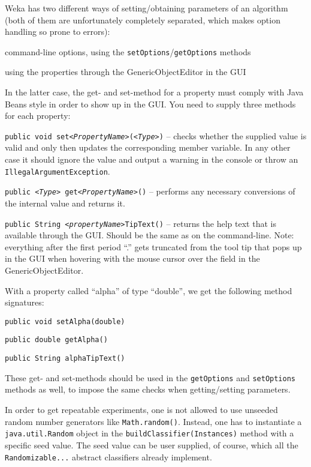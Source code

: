 Weka has two different ways of setting/obtaining parameters of an algorithm
(both of them are unfortunately completely separated, which makes option
handling so prone to errors):
\begin{tight_enumerate}
  \item command-line options, using the \texttt{setOptions}/\texttt{getOptions}
methods
  \item using the properties through the GenericObjectEditor in the GUI
\end{tight_enumerate}
In the latter case, the get- and set-method for a property must comply with 
Java Beans style in order to show up in the GUI. You need to supply three
methods for each property:
\begin{tight_itemize}
  \item \texttt{public void set\textit{<PropertyName>}(\textit{<Type>})} --
checks whether the supplied value is valid and only then updates the
corresponding member variable. In any other case it should ignore the value
and output a warning in the console or throw an
\texttt{IllegalArgumentException}.
  \item \texttt{public \textit{<Type>} get\textit{<PropertyName>}()} --
performs any necessary conversions of the internal value and returns it.
  \item \texttt{public String \textit{<propertyName>}TipText()} -- returns the
help text that is available through the GUI. Should be the same as on the
command-line. Note: everything after the first period ``.'' gets truncated from
the tool tip that pops up in the GUI when hovering with the mouse cursor over
the field in the GenericObjectEditor.
\end{tight_itemize}
With a property called ``alpha'' of type ``double'', we get the following
method signatures:
\begin{tight_itemize}
  \item \texttt{public void setAlpha(double)}
  \item \texttt{public double getAlpha()}
  \item \texttt{public String alphaTipText()}
\end{tight_itemize}
These get- and set-methods should be used in the \texttt{getOptions} and
\texttt{setOptions} methods as well, to impose the same checks when
getting/setting parameters.

In order to get repeatable experiments, one is not allowed to use unseeded
random number generators like \texttt{Math.random()}. Instead, one has to
instantiate a \texttt{java.util.Random} object in the
\texttt{buildClassifier(Instances)} method with a specific seed value. The seed
value can be user supplied, of course, which all the \texttt{Randomizable...}
abstract classifiers already implement.

